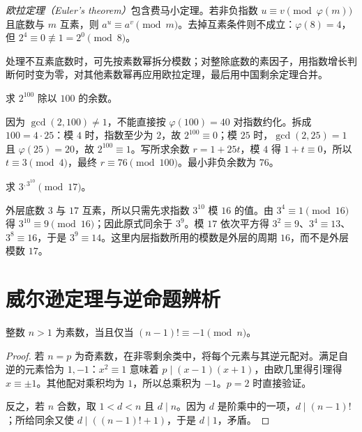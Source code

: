 \emph{欧拉定理（Euler's theorem）}包含费马小定理。若非负指数 $u\equiv v\pmod{\varphi(m)}$ 且底数与 $m$ 互素，则 $a^u\equiv a^v\pmod m$。去掉互素条件则不成立：$\varphi(8)=4$，但 $2^4\equiv0\not\equiv1=2^0\pmod8$。

处理不互素底数时，可先按素数幂拆分模数；对整除底数的素因子，用指数增长判断何时变为零，对其他素数幂再应用欧拉定理，最后用中国剩余定理合并。

\begin{example}[底数与模数不互素时的幂运算]
求 $2^{100}$ 除以 $100$ 的余数。
\end{example}
\begin{solve}
因为 $\gcd(2,100)\ne1$，不能直接按 $\varphi(100)=40$ 对指数约化。拆成 $100=4\cdot25$：模 $4$ 时，指数至少为 $2$，故 $2^{100}\equiv0$；模 $25$ 时，$\gcd(2,25)=1$ 且 $\varphi(25)=20$，故 $2^{100}\equiv1$。写所求余数 $r=1+25t$，模 $4$ 得 $1+t\equiv0$，所以 $t\equiv3\pmod4$，最终 $r\equiv76\pmod{100}$。最小非负余数为 $76$。
\end{solve}

\begin{example}[多层幂的模数需要逐层确定]
求 $3^{,3^{10}}\pmod{17}$。
\end{example}
\begin{solve}
外层底数 $3$ 与 $17$ 互素，所以只需先求指数 $3^{10}$ 模 $16$ 的值。由 $3^4\equiv1\pmod{16}$ 得 $3^{10}\equiv9\pmod{16}$；因此原式同余于 $3^9$。模 $17$ 依次平方得 $3^2\equiv9$、$3^4\equiv13$、$3^8\equiv16$，于是 $3^9\equiv14$。这里内层指数所用的模数是外层的周期 $16$，而不是外层模数 $17$。
\end{solve}

\section{威尔逊定理与逆命题辨析}

\begin{theorem}[威尔逊定理]
\label{thm:wilson}
整数 $n>1$ 为素数，当且仅当 $(n-1)!\equiv-1\pmod n$。
\end{theorem}
\begin{proof}
若 $n=p$ 为奇素数，在非零剩余类中，将每个元素与其逆元配对。满足自逆的元素恰为 $1,-1$：$x^2\equiv1$ 意味着 $p\mid(x-1)(x+1)$，由欧几里得引理得 $x\equiv\pm1$。其他配对乘积均为 $1$，所以总乘积为 $-1$。$p=2$ 时直接验证。

反之，若 $n$ 合数，取 $1<d<n$ 且 $d\mid n$。因为 $d$ 是阶乘中的一项，$d\mid(n-1)!$；所给同余又使 $d\mid((n-1)!+1)$，于是 $d\mid1$，矛盾。
\end{proof}


